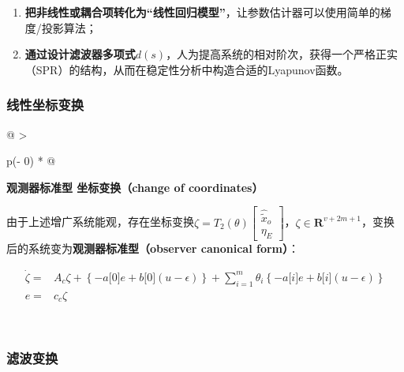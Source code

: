 \documentclass[
  12pt,
  a4paper
]{article}
\begin{document}
\begin{enumerate}
\def\labelenumi{\arabic{enumi}.}
\item
  \textbf{把非线性或耦合项转化为``线性回归模型''}，让参数估计器可以使用简单的梯度/投影算法；
\item
  \textbf{通过设计滤波器多项式}\(d(s)\)，人为提高系统的相对阶次，获得一个严格正实（SPR）的结构，从而在稳定性分析中构造合适的Lyapunov函数。
\end{enumerate}

\subsubsection{线性坐标变换}\label{ux7ebfux6027ux5750ux6807ux53d8ux6362}

\begin{longtable}[]{@{}
  >{\raggedright\arraybackslash}p{}@{}}
\toprule\noalign{}
\begin{minipage}[b]{\linewidth}\raggedright
\textbf{观测器标准型 坐标变换（change of coordinates）}

由于上述增广系统能观，存在坐标变换\(\zeta = T_{2}(\theta)\begin{bmatrix}
{\widehat{\widetilde{x}}}_{o} \\
\eta_{E}
\end{bmatrix}\)，\(\zeta \in \mathbf{R}^{v + 2m + 1}\)，变换后的系统变为\textbf{观测器标准型（observer
canonical form）}：

\[\begin{aligned}
\dot{\zeta} = & A_{c}\zeta + \left\{ - a\lbrack 0\rbrack e + b\lbrack 0\rbrack(u - \epsilon) \right\} + \sum_{i = 1}^{m}\theta_{i}\left\{ - a\lbrack i\rbrack e + b\lbrack i\rbrack(u - \epsilon) \right\} \\
e = & c_{c}\zeta
\end{aligned}\]
\end{minipage} \\
\midrule\noalign{}
\endhead
\bottomrule\noalign{}
\endlastfoot
\end{longtable}

\subsubsection{滤波变换}\label{ux6ee4ux6ce2ux53d8ux6362}
\end{document}
